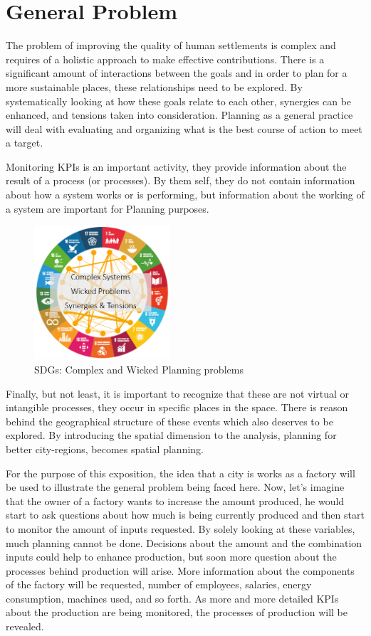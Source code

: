 \section{General Problem}
The problem of improving the quality of human settlements is complex and requires of a holistic approach to make effective contributions. There is a significant amount of interactions between the goals and in order to plan for a more sustainable places, these relationships need to be explored. By systematically looking at how these goals relate to each other, synergies can be enhanced, and tensions taken into consideration. Planning as a general practice will deal with evaluating and organizing what is the best course of action to meet a target. \par
%
Monitoring KPIs is an important activity, they provide information about the result of a process (or processes). By them self, they do not contain information about how a system works or is performing, but information about the working of a system are important for Planning purposes. \par
%
\begin{figure}[hbt!]
    \centering
    \includegraphics[width=0.45\textwidth]{Imgs/3_complex.PNG}
    \caption{SDGs: Complex and Wicked Planning problems}
    \label{fig:complex_sdg}
\end{figure}
%
Finally, but not least, it is important to recognize that these are not virtual or intangible processes, they occur in specific places in the space. There is reason behind the geographical structure of these events which also deserves to be explored. By introducing the spatial dimension to the analysis, planning for better city-regions, becomes spatial planning. \par

For the purpose of this exposition, the idea that a city is works as a factory will be used to illustrate the general problem being faced here. Now, let's imagine that the owner of a factory wants to increase the amount produced, he would start to ask questions about how much is being currently produced and then start to monitor the amount of inputs requested. By solely looking at these variables, much planning cannot be done. Decisions about the amount and the combination inputs could help to enhance production, but soon more question about the processes behind production will arise. More information about the components of the factory will be requested, number of employees, salaries, energy consumption, machines used, and so forth. As more and more detailed KPIs about the production are being monitored, the processes of production will be revealed. \par

